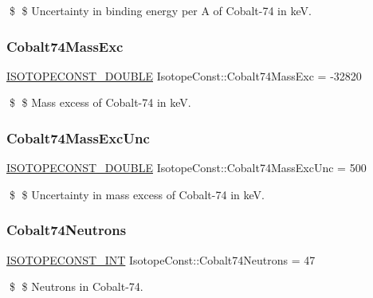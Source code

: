 \$ \$ Uncertainty in binding energy per A of Cobalt-\/74 in keV. \mbox{\label{group___isotope_const-_cobalt-_co74_gac21dc726ddc497ac2e86a0a189a11c3d}} 
\subsubsection{\texorpdfstring{Cobalt74\+Mass\+Exc}{Cobalt74MassExc}}
{\footnotesize\ttfamily \mbox{\hyperlink{group___isotope_const-_macros_ga8f45a7272ce02c0b4c65c44636ed719a}{I\+S\+O\+T\+O\+P\+E\+C\+O\+N\+S\+T\+\_\+\+D\+O\+U\+B\+LE}} Isotope\+Const\+::\+Cobalt74\+Mass\+Exc = -\/32820}

\$ \$ Mass excess of Cobalt-\/74 in keV. \mbox{\label{group___isotope_const-_cobalt-_co74_ga020f15bef790253772c161a79a3a8432}} 
\subsubsection{\texorpdfstring{Cobalt74\+Mass\+Exc\+Unc}{Cobalt74MassExcUnc}}
{\footnotesize\ttfamily \mbox{\hyperlink{group___isotope_const-_macros_ga8f45a7272ce02c0b4c65c44636ed719a}{I\+S\+O\+T\+O\+P\+E\+C\+O\+N\+S\+T\+\_\+\+D\+O\+U\+B\+LE}} Isotope\+Const\+::\+Cobalt74\+Mass\+Exc\+Unc = 500}

\$ \$ Uncertainty in mass excess of Cobalt-\/74 in keV. \mbox{\label{group___isotope_const-_cobalt-_co74_gaff1ea788891bf7f8b29432ef6ec655a8}} 
\subsubsection{\texorpdfstring{Cobalt74\+Neutrons}{Cobalt74Neutrons}}
{\footnotesize\ttfamily \mbox{\hyperlink{group___isotope_const-_macros_ga5f18360b3e99483a35c32d789e62621c}{I\+S\+O\+T\+O\+P\+E\+C\+O\+N\+S\+T\+\_\+\+I\+NT}} Isotope\+Const\+::\+Cobalt74\+Neutrons = 47}

\$ \$ Neutrons in Cobalt-\/74. \mbox{\label{group___isotope_const-_cobalt-_co74_gabecc326c4ad1ab84e7f587b30f109bea}} 
